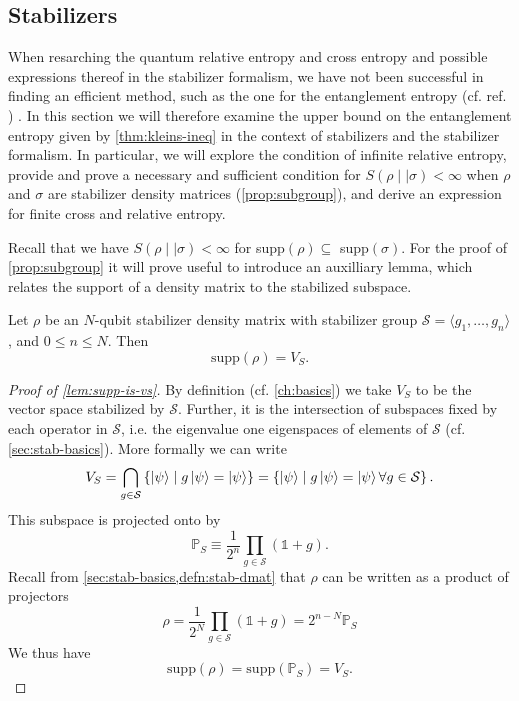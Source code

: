 \subsection{Stabilizers}\label{sec:rel-ent-stab}
When resarching the quantum relative entropy and cross entropy and possible
expressions thereof in the stabilizer formalism, we have not been successful in
finding an efficient method, such as the one for the entanglement entropy
(cf. ref. \cite{fattalEntanglementStabilizerFormalism2004})
\cite{veitchResourceTheoryStabilizer2014,niekampEntropicUncertaintyRelations2012,leoneStabilizerEntropiesAre2024,leonePhaseTransitionStabilizer2024,wuEntanglementUpperBound2011,vedralEntanglementMeasuresPurification1998,lindenQuantumEntropyCone2013,buExtremalityStabilizerStates2024,arabLectureNotesQuantum2024,nielsenQuantumComputationQuantum2010}.
In this section we will therefore examine the upper bound on the entanglement entropy
given by \cref{thm:kleins-ineq} in the context of stabilizers and the
stabilizer formalism. In particular, we will explore the condition of infinite
relative entropy,
provide and prove a necessary and sufficient condition
for $S(\rho\mid\mid\sigma)<\infty$ when $\rho$ and $\sigma$ are stabilizer
density matrices (\cref{prop:subgroup}), and derive an expression for finite cross
and relative entropy.

Recall that we have $S(\rho\mid\mid\sigma)<\infty$ for
supp$(\rho)\subseteq$ supp$(\sigma)$. For the proof of \cref{prop:subgroup} it
will prove useful to introduce an auxilliary lemma, which relates the support
of a density matrix to the stabilized subspace.
\begin{lem}\label{lem:supp-is-vs}
  Let $\rho$ be an $N$-qubit stabilizer density matrix with stabilizer group
  $\mathcal{S} = \langle
  g_1, \ldots, g_n \rangle$, and $0\leq n \leq N$.
  Then \[ \mathrm{supp}(\rho) = V_{S}.\]
\end{lem}
\begin{proof}[Proof of \cref{lem:supp-is-vs}]
  By definition (cf. \cref{ch:basics}) we take $V_{S}$ to be the vector space
  stabilized by $\mathcal{S}$.  Further, it is the intersection of subspaces fixed by
  each operator in $\mathcal{S}$, i.e. the eigenvalue one eigenspaces of
  elements of $\mathcal{S}$
  (cf. \cref{sec:stab-basics}). More
  formally we can write
  \[ 
    V_S = \bigcap_{g \in \mathcal{S}}  \left\{\ket{\psi} \mid g\ket{\psi} =
    \ket{\psi}\right\} = \left\{\ket{\psi} \mid g\ket{\psi} =
  \ket{\psi} \forall g \in \mathcal{S}\right\}.
  \]
  This subspace is projected onto by
  \[ \mathbb{P}_S \equiv \frac{1}{2^n} \prod_{g\in \mathcal{S}} \left(\mathds{1} + g\right).\]
  Recall from \cref{sec:stab-basics,defn:stab-dmat} that $\rho$ can be written as a product of
  projectors
  \[ \rho = \frac{1}{2^N} \prod_{g \in \mathcal{S}} \left(\mathds{1} + g\right)
  = 2^{n-N} \mathbb{P}_S \]
  We thus have
  \[ \mathrm{supp}(\rho) = \mathrm{supp}(\mathbb{P}_S) = V_S. \]
\end{proof}


